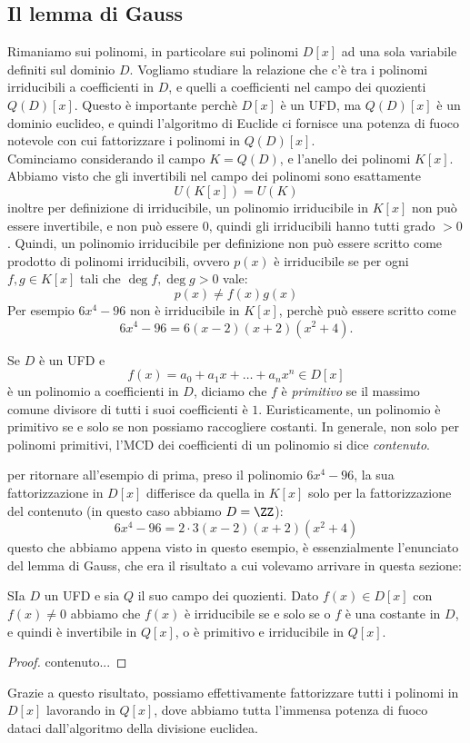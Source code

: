 \documentclass[11pt]{scrartcl}
\begin{document}
	 \subsection{Il lemma di Gauss}
	 
	 Rimaniamo sui polinomi, in particolare sui polinomi $D[x]$ ad una sola variabile definiti sul dominio $D$. Vogliamo studiare la relazione che c'è tra i polinomi irriducibili a coefficienti in $D$, e quelli a coefficienti nel campo dei quozienti $Q(D)[x]$. Questo è importante perchè $D[x]$ è un UFD, ma $Q(D)[x]$ è un dominio euclideo, e quindi l'algoritmo di Euclide ci fornisce una potenza di fuoco notevole con cui fattorizzare i polinomi in $Q(D)[x]$. \\
	 Cominciamo considerando il campo $K=Q(D)$, e l'anello dei polinomi $K[x]$. Abbiamo visto che gli invertibili nel campo dei polinomi sono esattamente
	 $$U\left(K[x]\right)=U\left(K\right)$$
	 inoltre per definizione di irriducibile, un polinomio irriducibile in $K[x]$ non può essere invertibile, e non può essere $0$, quindi gli irriducibili hanno tutti grado $>0$. Quindi, un polinomio irriducibile per definizione non può essere scritto come prodotto di polinomi irriducibili, ovvero $p(x)$ è irriducibile se per ogni $f,g\in K[x]$ tali che $\deg f, \deg g >0$ vale:
	 $$p(x)\ne f(x)g(x)$$
	 Per esempio $6x^4-96$ non è irriducibile in $K[x]$, perchè può essere scritto come
	 $$6x^4-96=6(x-2)(x+2)(x^2+4).$$
	 \begin{definition}
	 	Se $D$ è un UFD e 
	 	$$f(x)=a_0+a_1x+\dots+a_nx^n\in D[x]$$
	 	è un polinomio a coefficienti in $D$, diciamo che $f$ è \textit{primitivo} se il massimo comune divisore di tutti i suoi coefficienti è $1$. Euristicamente, un polinomio è primitivo se e solo se non possiamo raccogliere costanti. In generale, non solo per polinomi primitivi, l'MCD dei coefficienti di un polinomio si dice \textit{contenuto}.
	 \end{definition}
	 per ritornare all'esempio di prima, preso il polinomio $6x^4-96$, la sua fattorizzazione in $D[x]$ differisce da quella in $K[x]$ solo per la fattorizzazione del contenuto (in questo caso abbiamo $D=\ZZ$):
	 $$6x^4-96=2\cdot 3(x-2)(x+2)(x^2+4)$$
	 questo che abbiamo appena visto in questo esempio, è essenzialmente l'enunciato del lemma di Gauss, che era il risultato a cui volevamo arrivare in questa sezione:
	 \begin{theorem}
	 	SIa $D$ un UFD e sia $Q$ il suo campo dei quozienti. Dato $f(x)\in D[x]$ con $f(x)\ne 0$ abbiamo che $f(x)$ è irriducibile se e solo se o $f$ è una costante in $D$, e quindi è invertibile in $Q[x]$, o è primitivo e irriducibile in $Q[x]$.
	 \end{theorem}
	 \begin{proof}
	 	contenuto...
	 \end{proof}
	 Grazie a questo risultato, possiamo effettivamente fattorizzare tutti i polinomi in $D[x]$ lavorando in $Q[x]$, dove abbiamo tutta l'immensa potenza di fuoco dataci dall'algoritmo della divisione euclidea.
\end{document}
